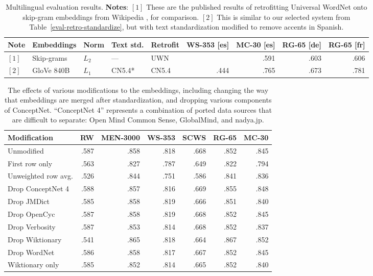\documentclass[letterpaper]{article}
\begin{document}
\begin{table*}[t]
\centering
\begin{tabular}{lllllrrrr}
\toprule
Note &Embeddings   & Norm  & Text std. & Retrofit & WS-353 [es] & MC-30 [es] & RG-65 [de] & RG-65 [fr] \\
\midrule
$[1]$&Skip-grams   & $L_2$ & ---       & UWN      &             &       .591 &       .603 &       .606 \\
$[2]$&GloVe 840B   & $L_1$ & CN5.4*    & CN5.4    &        .444 &       .765 &       .673 &       .781 \\
\bottomrule
\end{tabular}

\caption{
    Multilingual evaluation results.
    {\bf Notes}: $[1]$ These are the published results of retrofitting
    Universal WordNet onto skip-gram embeddings from Wikipedia
    \cite{faruqui2014retrofitting}, for comparison. $[2]$ This is similar to our
    selected system from Table~\ref{eval-retro-standardize}, but with text
    standardization modified to remove accents in Spanish.
}
\label{eval-multilingual}
\end{table*}

\begin{table*}[t]
\centering
\begin{tabular}{lrrrrrr}
\toprule
Modification        &   RW &  MEN-3000 &  WS-353 &  SCWS &  RG-65 &  MC-30 \\
\midrule
Unmodified          & .587 &      .858 &    .818 &  .668 &   .852 &   .845 \\
\midrule
First row only      & .563 &      .827 &    .787 &  .649 &   .822 &   .794 \\
Unweighted row avg. & .526 &      .844 &    .751 &  .586 &   .841 &   .836 \\
\midrule
Drop ConceptNet 4   & .588 &      .857 &    .816 &  .669 &   .855 &   .848 \\
Drop JMDict         & .585 &      .858 &    .819 &  .666 &   .851 &   .840 \\
Drop OpenCyc        & .587 &      .858 &    .819 &  .668 &   .852 &   .845 \\
Drop Verbosity      & .587 &      .853 &    .814 &  .668 &   .852 &   .837 \\
Drop Wiktionary     & .541 &      .865 &    .818 &  .664 &   .867 &   .852 \\
Drop WordNet        & .586 &      .858 &    .817 &  .667 &   .852 &   .845 \\
Wiktionary only     & .585 &      .852 &    .814 &  .665 &   .852 &   .840 \\
\bottomrule
\end{tabular}
\caption{
    The effects of various modifications to the embeddings, including
    changing the way that embeddings are merged after standardization, and
    dropping various components of ConceptNet. ``ConceptNet 4''
    represents a combination of ported data sources that are difficult to
    separate: Open Mind Common Sense, GlobalMind, and nadya.jp.
}
\label{eval-variations}
\end{table*}
\end{document}
